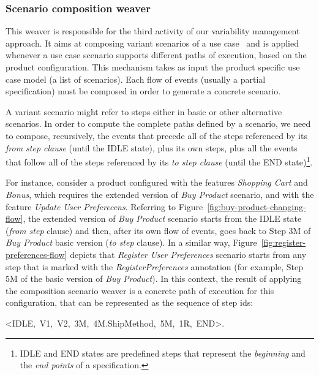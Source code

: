 \documentclass{acm_proc_article-sp}
\begin{document}

\subsubsection{Scenario composition weaver}\label{sub:sc-weaver}

This weaver is responsible for the third activity of our variability management 
approach. It aims at composing variant scenarios of a use case~\cite{gcabral-sbmf-2006} and 
is applied whenever a use case scenario supports different paths of execution, based on the product configuration.
This mechanism takes as input the product specific use case model (a list of scenarios). Each flow of events 
(usually a partial specification) must be composed in order to generate a concrete scenario.

A variant scenario 
might refer to steps either in basic or other alternative scenarios. In order
to compute the complete paths defined by a scenario, we need to compose,
recursively, the events that precede all of the steps referenced by its \emph{from step
clause} (until the IDLE state), plus its own steps, plus all the
events that follow all of the steps referenced by its \emph{to step clause} (until the END
state)\footnote{IDLE and END states are predefined steps that
represent the \emph{beginning} and the \emph{end points} of a
specification.}. 

For instance, consider a product configured with the features \emph{Shopping Cart} and \emph{Bonus}, which requires the extended version of \emph{Buy Product} scenario, and with the feature \emph{Update User Preferecens}. Referring to Figure~\ref{fig:buy-product-changing-flow}, the extended version of 
\emph{Buy Product} scenario starts from the IDLE state (\emph{from step} clause) and then, after its own flow of events, goes back to Step 3M of \emph{Buy Product} basic version (\emph{to step} clause). In a similar way, Figure~\ref{fig:register-preferences-flow} depicts that \emph{Register User Preferences} scenario starts from any step that is marked with the \emph{RegisterPreferences} annotation (for example, Step 5M of the basic version of \emph{Buy Product}). In this context, the result of applying the composition scenario weaver is a concrete path of execution for this configuration, that can be represented as the sequence of step ids: 

\begin{center}
\mbox{<IDLE, V1, V2, 3M, 4M.ShipMethod, 5M, 1R, END>}.
\end{center}
\end{document}
